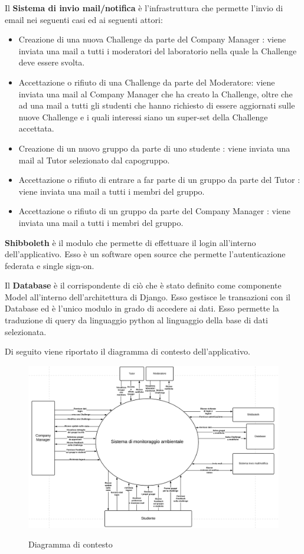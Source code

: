 Il \textbf{Sistema di invio mail/notifica} è l'infrastruttura che permette l'invio di email nei seguenti casi ed ai seguenti attori:
\begin{itemize}
    \item Creazione di una nuova Challenge da parte del Company Manager : viene inviata una mail a tutti i moderatori del laboratorio nella quale la Challenge deve essere svolta. 
    \item Accettazione o rifiuto di una Challenge da parte del Moderatore: viene inviata una mail al Company Manager che ha creato la Challenge, oltre che ad una mail a tutti gli studenti che hanno richiesto di essere aggiornati sulle nuove Challenge e i quali interessi siano un super-set della Challenge accettata.
    \item Creazione di un nuovo gruppo da parte di uno studente : viene inviata una mail al Tutor selezionato dal capogruppo.
    \item Accettazione o rifiuto di entrare a far parte di un gruppo da parte del Tutor : viene inviata una mail a tutti i membri del gruppo.
    \item Accettazione o rifiuto di un gruppo da parte del Company Manager : viene inviata una mail a tutti i membri del gruppo.
\end{itemize}

\textbf{Shibboleth} è il modulo che permette di effettuare il login all'interno dell'applicativo. Esso è un software open source che permette l'autenticazione federata e single sign-on.

Il \textbf{Database} è il corrispondente di ciò che è stato definito come componente Model all'interno dell'architettura di Django. Esso gestisce le transazioni con il Database ed è l'unico modulo in grado di accedere ai dati. Esso permette la traduzione di query da linguaggio python al linguaggio della base di dati selezionata. 

Di seguito viene riportato il diagramma di contesto dell'applicativo.


\begin{figure}
    \centering
    \includegraphics[scale=0.46]{images/diagrama_di_contesto.png}
    \label{fig:diagrama_di_contesto}
    \caption{Diagramma di contesto}
\end{figure}

